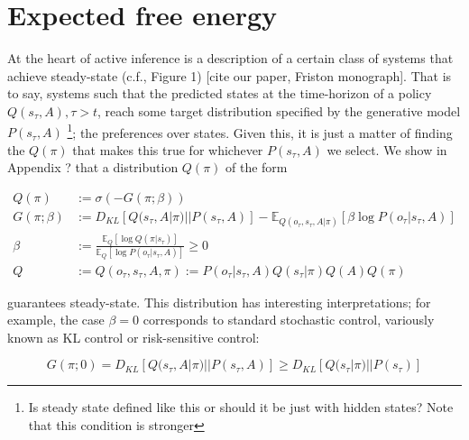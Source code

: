 \documentclass{article}
\theoremstyle{plain}
\theoremstyle{definition}
\theoremstyle{proposition}
\theoremstyle{corollary}
\theoremstyle{lemma}
\theoremstyle{remark}
\theoremstyle{example}
\begin{document}
\tableofcontents

\section{Expected free energy}

At the heart of active inference is a description of a certain class of systems that achieve steady-state (c.f., Figure 1) [cite our paper, Friston monograph]. That is to say, systems such that the predicted states at the time-horizon of a policy $Q(s_\tau,A), \tau >t$, reach some target distribution specified by the generative model $P(s_\tau,A)$ \footnote{Is steady state defined like this or should it be just with hidden states? Note that this condition is stronger}; the preferences over states. Given this, it is just a matter of finding the $Q(\pi)$ that makes this true for whichever $P(s_\tau, A)$ we select. We show in Appendix ? that a distribution $Q(\pi)$ of the form

\begin{align}
   Q(\pi) &:=\sigma(-G(\pi; \beta)) \\
   G(\pi; \beta) &:= D_{KL}[Q(s_\tau, A|\pi)||P(s_\tau, A)]- \mathbb E_{Q(o_\tau,s_\tau, A|\pi)}[\beta \log P(o_\tau |s_\tau, A)]  \\
   \beta &:=\frac{\mathbb E_{Q}[\log Q(\pi|s_\tau)]}{\mathbb E_{Q}[\log P(o_\tau |s_\tau, A)]} \geq 0 \\
   Q &:= Q(o_\tau, s_\tau, A, \pi) := P(o_\tau|s_\tau, A) Q(s_\tau|\pi)Q(A)Q(\pi)
\end{align}

guarantees steady-state. This distribution has interesting interpretations; for example, the case $\beta=0$ corresponds to standard stochastic control, variously known as KL control or risk-sensitive control:

\begin{equation}
    G(\pi; 0) = D_{KL}[Q(s_\tau, A|\pi)||P(s_\tau, A)] \geq D_{KL}[Q(s_\tau |\pi)||P(s_\tau)]
\end{equation}
\end{document}
